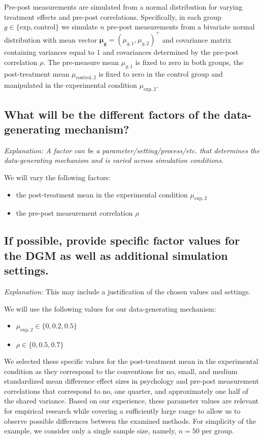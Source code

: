\documentclass[12pt]{article}
\begin{document}
\begin{examplebox}
Pre-post measurements are simulated from a normal distribution for varying treatment effects and pre-post correlations. Specifically, in each group $g \in \{\text{exp}, \text{control}\}$ we simulate $n$ pre-post measurements from a bivariate normal distribution with mean vector $\boldsymbol{\mu_g} = (\mu_{g,1}, \mu_{g,2})^\top$ and covariance matrix containing variances equal to 1 and covariances determined by the pre-post correlation $\rho$. The pre-measure mean ${\mu_{g,1}}$ is fixed to zero in both groups, the post-treatment mean ${\mu_{\text{control},2}}$ is fixed to zero in the control group and manipulated in the experimental condition ${\mu_{\text{exp},2}}$.
\end{examplebox}

\subsection{What will be the different factors of the data-generating mechanism?}
\textit{Explanation: A factor can be a parameter/setting/process/etc. that determines the data-generating mechanism and is varied across simulation conditions.}
\begin{examplebox}
We will vary the following factors:
\begin{itemize}
    \item the post-treatment mean in the experimental condition ${\mu_{\text{exp},2}}$
    \item the pre-post measurement correlation $\rho$
\end{itemize}
\end{examplebox}

\subsection{If possible, provide specific factor values for the DGM as well as additional simulation settings.}
\textit{Explanation:} This may include a justification of the chosen values and settings.

\begin{examplebox}
We will use the following values for our data-generating mechanism:
\begin{itemize}
        \item ${\mu_{\text{exp},2}} \in \{0, 0.2, 0.5\}$
        \item $\rho \in \{0, 0.5, 0.7\}$
\end{itemize}
We selected these specific values for the post-treatment mean in the experimental condition as they correspond to the conventions for no, small, and medium standardized mean difference effect sizes in psychology \parencite{Cohen1988} and pre-post measurement correlations that correspond to no, one quarter, and approximately one half of the shared variance. Based on our experience, these parameter values are relevant for empirical research while covering a sufficiently large range to allow us to observe possible differences between the examined methods. For simplicity of the example, we consider only a single sample size, namely, $n = 50$ per group.
\end{examplebox}
\end{document}
